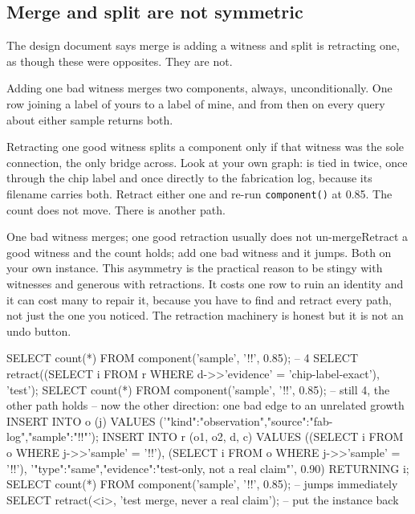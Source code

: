\subsection{Merge and split are not symmetric}

The design document says merge is adding a witness and split is retracting one, as though these were opposites. They are not.

Adding one bad witness merges two components, always, unconditionally. One row joining a label of yours to a label of mine, and from then on every query about either sample returns both.

Retracting one good witness splits a component only if that witness was the sole connection, the only bridge across. Look at your own graph: \texttt{\labSamplePostbond} is tied in twice, once through the chip label and once directly to the fabrication log, because its filename carries both. Retract either one and re-run \texttt{component()} at 0.85. The count does not move. There is another path.

\begin{Correspondence}{One bad witness merges; one good retraction usually does not un-merge}{Retract a good witness and the count holds; add one bad witness and it jumps. Both on your own instance.}
This asymmetry is the practical reason to be stingy with witnesses and generous with retractions. It costs one row to ruin an identity and it can cost many to repair it, because you have to find and retract every path, not just the one you noticed. The retraction machinery is honest but it is not an undo button.
\begin{Check}
SELECT count(*) FROM component('sample', '!\labSample!', 0.85);   -- 4
SELECT retract((SELECT i FROM r WHERE d->>'evidence' = 'chip-label-exact'), 'test');
SELECT count(*) FROM component('sample', '!\labSample!', 0.85);   -- still 4, the other path holds
-- now the other direction: one bad edge to an unrelated growth
INSERT INTO o (j) VALUES
  ('{"kind":"observation","source":"fab-log","sample":"!\labSampleUnrelated!"}');
INSERT INTO r (o1, o2, d, c) VALUES
  ((SELECT i FROM o WHERE j->>'sample' = '!\labSample!'),
   (SELECT i FROM o WHERE j->>'sample' = '!\labSampleUnrelated!'),
   '{"type":"same","evidence":"test-only, not a real claim"}', 0.90)
RETURNING i;
SELECT count(*) FROM component('sample', '!\labSample!', 0.85);   -- jumps immediately
SELECT retract(<i>, 'test merge, never a real claim');             -- put the instance back
\end{Check}
\end{Correspondence}


